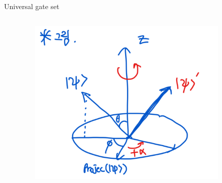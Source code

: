 \documentclass[9pt]{beamer}
\begin{document}
\begin{section}{Universal gate set}
\begin{frame}
\begin{columns}
\begin{column}{0.7\textwidth}
                \end{column}
                \begin{column}{0.3\textwidth}
                    \begin{figure}
                        \includegraphics[width=0.9\textwidth]{image/L2_rotation.png}
                    \end{figure}                    
                \end{column}
            \end{columns}

        \end{frame}


\end{section}
\end{document}
